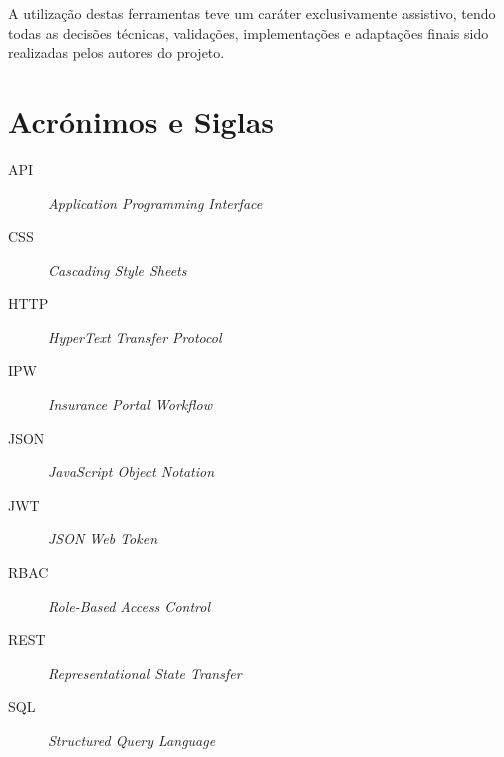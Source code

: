 \documentclass[a4paper,openright,twoside,11pt]{report}
\begin{document}
A utilização destas ferramentas teve um caráter exclusivamente assistivo, tendo todas as decisões técnicas, validações, implementações e adaptações finais sido realizadas pelos autores do projeto.


\cleardoublepage

\chapter*{Acrónimos e Siglas}
\begin{description}
  \item[API] \textit{Application Programming Interface}
  \item[CSS] \textit{Cascading Style Sheets}
  \item[HTTP] \textit{HyperText Transfer Protocol}
  \item[IPW] \textit{Insurance Portal Workflow}
  \item[JSON] \textit{JavaScript Object Notation}
  \item[JWT] \textit{JSON Web Token}
  \item[RBAC] \textit{Role-Based Access Control}
  \item[REST] \textit{Representational State Transfer}
  \item[SQL] \textit{Structured Query Language}
\end{description}
\cleardoublepage
\tableofcontents \cleardoublepage

\listoffigures \cleardoublepage

\setcounter{page}{1}









\cleardoublepage
{}



%
\end{document}
